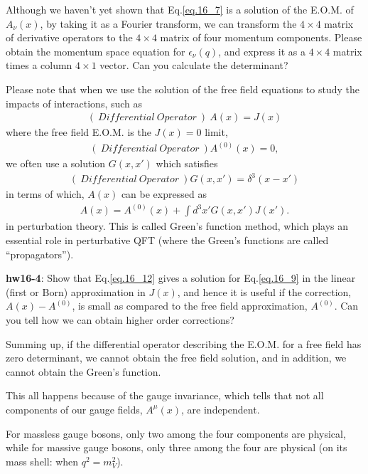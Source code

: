 \documentclass[12pt]{article}
\begin{document}
Although we haven't yet shown that Eq.\ref{eq.16_7} is a solution of the E.O.M. of $A_\nu(x)$, by taking it as a Fourier transform, we can transform the
$4\times 4$ matrix of derivative operators to the $4\times 4$ matrix of four momentum
components. Please obtain the momentum space equation for
$\epsilon_\nu(q)$, and express it as a $4\times 4$ matrix times a column $4\times 1$
vector. Can you calculate the determinant?

Please note that when we use the solution of the free field equations
to study the impacts of interactions, such as
\begin{eqnarray}
  (~ Differential~ Operator~ ) ~A(x) = J(x) \label{eq.16_9}
\end{eqnarray}
where the free field E.O.M. is the $J(x)=0$ limit,
\begin{eqnarray}
  (~ Differential~ Operator~ )  A^{(0)}(x) = 0, \label{eq.16_10}
\end{eqnarray}
we often use a solution $G(x,x')$ which satisfies
\begin{eqnarray}
  (~ Differential~ Operator~ ) G(x,x') = \delta^3(x-x') \label{eq.16_11}
\end{eqnarray}
in terms of which, $A(x)$ can be expressed as
\begin{eqnarray}
  A(x) = A^{(0)}(x) + \int d^3x' G(x,x') J(x'). \label{eq.16_12}
\end{eqnarray}
in perturbation theory. This is called Green's function method,
which plays an essential role in perturbative QFT (where the
Green's functions are called ``propagators'').

{\bf hw16-4}:  Show that Eq.\ref{eq.16_12} gives a solution for Eq.\ref{eq.16_9} in the linear (first or Born) approximation in $J(x)$, and hence it is useful if the correction, $A(x)-A^{(0)}$, is small as compared to the
free field approximation, $A^{(0)}$.  Can you tell how we can
obtain higher order corrections?

Summing up, if the differential operator describing the E.O.M. for
a free field has zero determinant, we cannot obtain the free field
solution, and in addition, we cannot obtain the Green's function.

This all happens because of the gauge invariance, which tells that
not all components of our gauge fields, $A^\mu(x)$, are independent.

For massless gauge bosons, only two among the four components are
physical, while for massive gauge bosons, only three among the four
are physical (on its mass shell: when $q^2 = m_V^2$).
\end{document}
